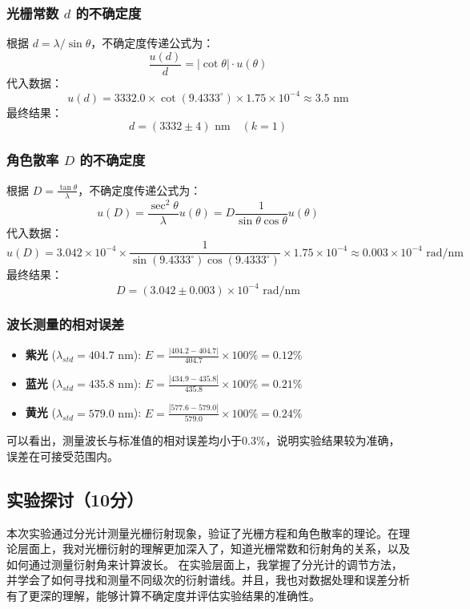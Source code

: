 \documentclass[]{../template/Report}%
\begin{document}
\begin{fullreportonly}
\subsubsection{光栅常数 $d$ 的不确定度}
根据 $d = \lambda / \sin \theta$，不确定度传递公式为：
\[
\frac{u(d)}{d} = |\cot \theta| \cdot u(\theta)
\]
代入数据：
\[
u(d) = 3332.0 \times \cot(9.4333^\circ) \times 1.75 \times 10^{-4} \approx 3.5 \text{ nm}
\]
最终结果：
\[
d = (3332 \pm 4) \text{ nm} \quad (k=1)
\]

\subsubsection{角色散率 $D$ 的不确定度}
根据 $D = \frac{\tan \theta}{\lambda}$，不确定度传递公式为：
\[
u(D) = \frac{\sec^2 \theta}{\lambda} u(\theta) = D \frac{1}{\sin\theta \cos\theta} u(\theta)
\]
代入数据：
\[
u(D) = 3.042 \times 10^{-4} \times \frac{1}{\sin(9.4333^\circ)\cos(9.4333^\circ)} \times 1.75 \times 10^{-4} \approx 0.003 \times 10^{-4} \text{ rad/nm}
\]
最终结果：
\[
D = (3.042 \pm 0.003) \times 10^{-4} \text{ rad/nm}
\]


\subsubsection{波长测量的相对误差}
\begin{itemize}
    \item \textbf{紫光} ($\lambda_{std} = 404.7 \text{ nm}$): $E = \frac{|404.2 - 404.7|}{404.7} \times 100\% = 0.12\%$
    \item \textbf{蓝光} ($\lambda_{std} = 435.8 \text{ nm}$): $E = \frac{|434.9 - 435.8|}{435.8} \times 100\% = 0.21\%$
    \item \textbf{黄光} ($\lambda_{std} = 579.0 \text{ nm}$): $E = \frac{|577.6 - 579.0|}{579.0} \times 100\% = 0.24\%$
\end{itemize}

可以看出，测量波长与标准值的相对误差均小于0.3\%，说明实验结果较为准确，误差在可接受范围内。
\subsection{实验探讨（10分）}
本次实验通过分光计测量光栅衍射现象，验证了光栅方程和角色散率的理论。在理论层面上，我对光栅衍射的理解更加深入了，知道光栅常数和衍射角的关系，以及如何通过测量衍射角来计算波长。
在实验层面上，我掌握了分光计的调节方法，并学会了如何寻找和测量不同级次的衍射谱线。并且，我也对数据处理和误差分析有了更深的理解，能够计算不确定度并评估实验结果的准确性。


\end{fullreportonly}
\end{document}

